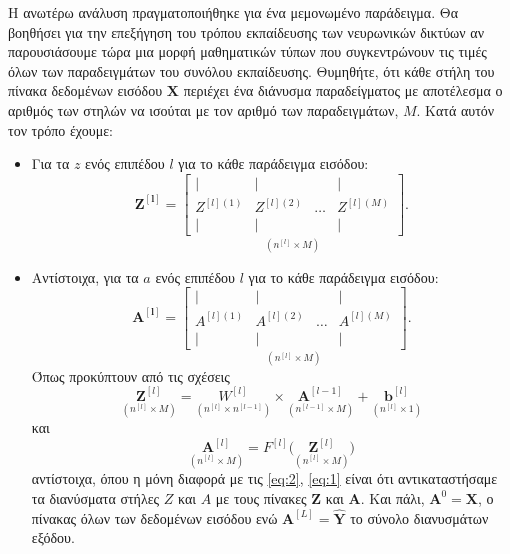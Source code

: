 Η ανωτέρω ανάλυση πραγματοποιήθηκε για ένα μεμονωμένο παράδειγμα. Θα βοηθήσει για την επεξήγηση του τρόπου εκπαίδευσης των νευρωνικών δικτύων αν παρουσιάσουμε τώρα μια μορφή μαθηματικών τύπων που συγκεντρώνουν τις τιμές όλων των παραδειγμάτων του συνόλου εκπαίδευσης. Θυμηθήτε, ότι κάθε στήλη του πίνακα δεδομένων εισόδου $\boldsymbol{X}$ περιέχει ένα διάνυσμα παραδείγματος με αποτέλεσμα ο αριθμός των στηλών να ισούται με τον αριθμό των παραδειγμάτων, $M$. Κατά αυτόν τον τρόπο έχουμε:
\begin{itemize}
  \item Για τα $z$ ενός επιπέδου $l$ για το κάθε παράδειγμα εισόδου:
  \begin{equation}
    \boldsymbol{Z^{[l]}} =
    \underset{(n^{[l]} \times M)}{\begin{bmatrix}
        |&|&&| \\
        Z^{[l](1)} & Z^{[l](2)} & \dots & Z^{[l](M)}\\
        |&|&&|
    \end{bmatrix}}.
  \end{equation}
  \item Αντίστοιχα, για τα $a$ ενός επιπέδου $l$ για το κάθε παράδειγμα εισόδου:
  \begin{equation}
    \boldsymbol{A^{[l]}} =
    \underset{(n^{[l]} \times M)}{\begin{bmatrix}
        |&|&&| \\
        A^{[l](1)} & A^{[l](2)} & \dots & A^{[l](M)}\\
        |&|&&|
    \end{bmatrix}}.
  \end{equation}
  Όπως προκύπτουν από τις σχέσεις 
  \begin{equation}
    \underset{(n^{[l]} \times M)}{\boldsymbol{Z}^{[l]}} = \underset{(n^{[l]} \times n^{[l-1]})}{W^{[l]}} \times \underset{(n^{[l-1]} \times M)}{\boldsymbol{A}^{[l-1]}} + \underset{(n^{[l]} \times 1)}{\boldsymbol{b}^{[l]}}
  \end{equation}
   και 
  \begin{equation}
    \underset{(n^{[l]} \times M)}{\boldsymbol{A}^{[l]}} = F^{[l]}\big(\underset{(n^{[l]} \times M)}{\boldsymbol{Z}^{[l]}}\big)
  \end{equation} 
  αντίστοιχα, όπου η μόνη διαφορά με τις \ref{eq:2}, \ref{eq:1} είναι ότι αντικαταστήσαμε τα διανύσματα στήλες $Z$ και $A$ με τους πίνακες $\boldsymbol{Z}$ και $\boldsymbol{A}$. Και πάλι, $\boldsymbol{A}^{0} = \boldsymbol{X}$, ο πίνακας όλων των δεδομένων εισόδου ενώ $\boldsymbol{A}^{[L]} = \boldsymbol{\hat{Y}}$ το σύνολο διανυσμάτων εξόδου.
\end{itemize}

